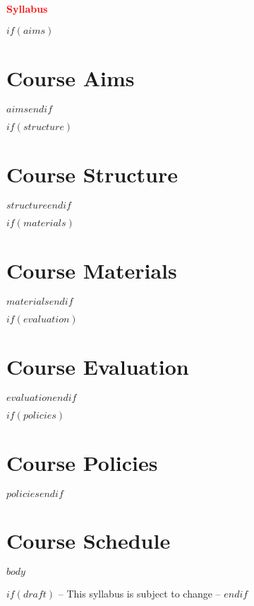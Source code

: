 \documentclass[11pt,a4paper]{article}
\begin{document}
\textbf{\textcolor{red}{Syllabus}}	

$if(aims)$\section*{Course Aims}

$aims$$endif$

$if(structure)$\section*{Course Structure}

$structure$$endif$

$if(materials)$\section*{Course Materials}

$materials$$endif$

$if(evaluation)$\section*{Course Evaluation}

$evaluation$$endif$

$if(policies)$\section*{Course Policies}

$policies$$endif$


\section*{Course Schedule}

$body$

$if(draft)$
\centering
	-- This syllabus is subject to change --
$endif$
\end{document}
